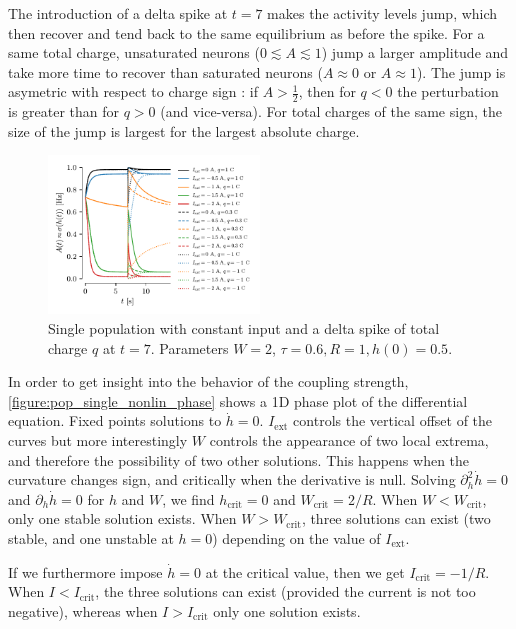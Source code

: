 \documentclass[10pt,conference,compsocconf,a4paper]{IEEEtran}
\newcommand*{\shortautoref}[1]{%
	\begingroup
	\def\equationautorefname{\textsc{Eq.}}%
	\def\tableautorefname{\textsc{Tab.}}%
	\def\figureautorefname{\textsc{Fig.}}%
	\autoref{#1}%
	\endgroup
}
\begin{document}
		The introduction of a delta spike at $t = 7$ makes the activity levels jump, which then recover and tend back to the same equilibrium as before the spike. For a same total charge, unsaturated neurons ($0 \lesssim A \lesssim 1$) jump a larger amplitude and take more time to recover than saturated neurons ($A \approx 0$ or $A \approx 1$). The jump is asymetric with respect to charge sign : if $A > \frac 12$, then for $q < 0$ the perturbation is greater than for $q > 0$ (and vice-versa). For total charges of the same sign, the size of the jump is largest for the largest absolute charge.

		\begin{figure}
			\centering
			\includegraphics[width=0.5\textwidth]{figures/pop_single_nonlin.pdf}
			\caption{Single population with constant input and a delta spike of total charge $q$ at $t = 7$. Parameters $W = 2$, $\tau = 0.6, R = 1, h(0) = 0.5$.}
			\label{figure:pop_single_nonlin}
		\end{figure}

		In order to get insight into the behavior of the coupling strength, \shortautoref{figure:pop_single_nonlin_phase} shows a 1D phase plot of the differential equation. Fixed points solutions to $\dot h = 0$. $I_{\text{ext}}$ controls the vertical offset of the curves but more interestingly $W$ controls the appearance of two local extrema, and therefore the possibility of two other solutions. This happens when the curvature changes sign, and critically when the derivative is null. Solving $\partial^2_h \dot h = 0$ and $\partial_h \dot h = 0$ for $h$ and $W$, we find $h_{\text{crit}} = 0$ and $W_{\text{crit}} = 2/R$. When $W < W_{\text{crit}}$, only one stable solution exists. When $W > W_{\text{crit}}$, three solutions can exist (two stable, and one unstable at $h = 0$) depending on the value of $I_{\text{ext}}$.
		
		If we furthermore impose $\dot h = 0$ at the critical value, then we get $I_{\text{crit}} = -1/R$. When $I < I_{\text{crit}}$, the three solutions can exist (provided the current is not too negative), whereas when $I > I_{\text{crit}}$ only one solution exists.
\end{document}
